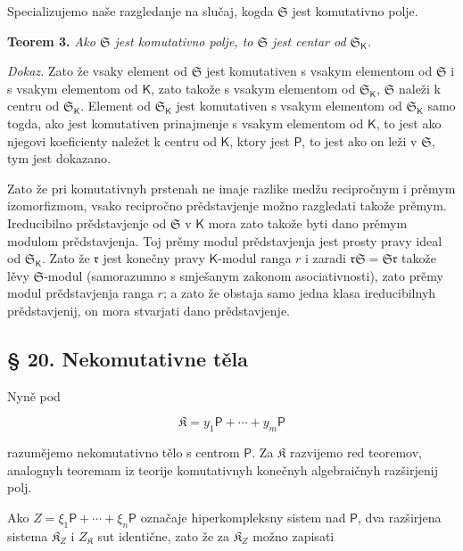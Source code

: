 \documentclass[11pt]{article}
\begin{document}
Specializujemo naše razgledanje na slučaj, kogda \(\mathfrak S\) jest komutativno polje.

\textbf{Teorem 3.} \emph{Ako \(\mathfrak S\) jest komutativno polje, to \(\mathfrak S\) jest centar od \(\mathfrak S_{\mathsf K}\).}

\emph{Dokaz.} Zato že vsaky element od \(\mathfrak S\) jest komutativen s vsakym elementom od \(\mathfrak S\) i s vsakym elementom od \(\mathsf K\), zato takože s vsakym elementom od \(\mathfrak S_{\mathsf K}\), \(\mathfrak S\) naleži k centru od \(\mathfrak S_{\mathsf K}\). Element od \(\mathfrak S_{\mathsf K}\) jest komutativen s vsakym elementom od \(\mathfrak S_{\mathsf K}\) samo togda, ako jest komutativen prinajmenje s vsakym elementom od \(\mathsf K\), to jest ako njegovi koeficienty naležet k centru od \(\mathsf K\), ktory jest \(\mathsf P\), to jest ako on leži v \(\mathfrak S\), tym jest dokazano.

Zato že pri komutativnyh prstenah ne imaje razlike medžu recipročnym i prěmym izomorfizmom, vsako recipročno prědstavjenje možno razgledati takože prěmym. Ireducibilno prědstavjenje od \(\mathfrak S\) v \(\mathsf K\) mora zato takože byti dano prěmym modulom prědstavjenja. Toj prěmy modul prědstavjenja jest prosty pravy ideal od \(\mathfrak S_{\mathsf K}\). Zato že \(\mathfrak r\) jest konečny pravy \(\mathsf K\)-modul ranga \(r\) i zaradi \(\mathfrak r\mathfrak S=\mathfrak S\mathfrak r\) takože lěvy \(\mathfrak S\)-modul (samorazumno s smješanym zakonom asociativnosti), zato prěmy modul prědstavjenja ranga \(r\); a zato že obstaja samo jedna klasa ireducibilnyh prědstavjenij, on mora stvarjati dano prědstavjenje.

\subsection*{§ 20. Nekomutativne těla}\label{nichtkommutative-koerper}

Nyně pod

\[
\mathfrak K=y_1\mathsf P+\cdots+y_m\mathsf P
\]

razumějemo nekomutativno tělo s centrom \(\mathsf P\). Za \(\mathfrak K\) razvijemo red teoremov, analognyh teoremam iz teorije komutativnyh konečnyh algebraičnyh razširjenij polj.

Ako \(Z=\xi_1\mathsf P+\cdots+\xi_n\mathsf P\) označaje hiperkompleksny sistem nad \(\mathsf P\), dva razširjena sistema \(\mathfrak K_Z\) i \(Z_{\mathfrak K}\) sut identične, zato že za \(\mathfrak K_Z\) možno zapisati
\end{document}
